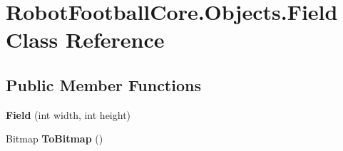 \hypertarget{class_robot_football_core_1_1_objects_1_1_field}{\section{Robot\-Football\-Core.\-Objects.\-Field Class Reference}
\label{class_robot_football_core_1_1_objects_1_1_field}
}
\subsection*{Public Member Functions}
\begin{DoxyCompactItemize}
\item 
\hypertarget{class_robot_football_core_1_1_objects_1_1_field_a954a7122926206ba92555991c13f91af}{{\bfseries Field} (int width, int height)}\label{class_robot_football_core_1_1_objects_1_1_field_a954a7122926206ba92555991c13f91af}

\item 
\hypertarget{class_robot_football_core_1_1_objects_1_1_field_a2c6d37f1d83a73297821dae091145803}{Bitmap {\bfseries To\-Bitmap} ()}\label{class_robot_football_core_1_1_objects_1_1_field_a2c6d37f1d83a73297821dae091145803}

\end{DoxyCompactItemize}
